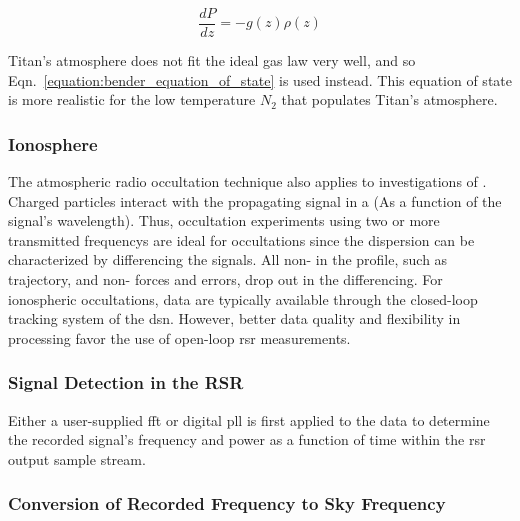 \documentclass{article}
\begin{document}
            \begin{equation}
            \label{equation:bender_equation_of_state}
            \frac{dP}{dz} = -g(z)\rho(z)
            \end{equation}
            
            \noindent Titan's atmosphere does not fit the ideal gas law very well, and so Eqn.~\ref{equation:bender_equation_of_state} is used instead. This equation of state is more realistic for the low temperature $N_2$ that populates Titan's atmosphere. 
            
            \subsubsection{\footnotesize Ionosphere}
            
            The atmospheric radio \gls{occultation} technique also applies to investigations of . Charged particles interact with the propagating signal in a  (As a function of the signal’s wavelength). Thus, \gls{occultation} experiments using two or more transmitted \glspl{frequency} are ideal for  \glspl{occultation} since the \gls{dispersion} can be characterized by differencing the signals. All non- in the  profile, such as \gls{trajectory},  and non- forces and errors, drop out in the differencing. For ionospheric \glspl{occultation},  data are typically available through the \gls{closed-loop} tracking system of the \gls{dsn}. However, better data quality and flexibility in processing favor the use of \gls{open-loop} \gls{rsr} measurements.
            
            \subsubsection{\footnotesize Signal Detection in the RSR}
            
            Either a user-supplied \gls{fft} or digital \gls{pll} is first applied to the data to determine the recorded signal’s \gls{frequency} and \gls{power} as a function of time within the \gls{rsr} output sample stream. 
            
            \subsubsection{\footnotesize Conversion of Recorded Frequency to Sky Frequency}
            
\end{document}
